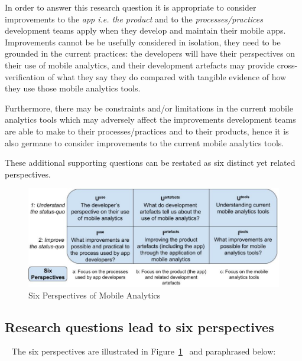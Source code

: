 In order to answer this research question it is appropriate to consider improvements to the \emph{app i.e. the product} and to the \emph{processes/practices} development teams apply when they develop and maintain their mobile apps. Improvements cannot be be usefully considered in isolation, they need to be grounded in the current practices: the developers will have their perspectives on their use of mobile analytics, and their development artefacts may provide cross-verification of what they say they do compared with tangible evidence of how they use those mobile analytics tools. 

Furthermore, there may be constraints and/or limitations in the current mobile analytics tools which may adversely affect the improvements development teams are able to make to their processes/practices and to their products, hence it is also germane to consider improvements to the current mobile analytics tools.

These additional supporting questions can be restated as six distinct yet related perspectives.

\begin{figure}
    \includegraphics[width=\linewidth]{images/my/six-perspectives-2x3-matrix-12-nov-2021.jpeg}
    \caption{Six Perspectives of Mobile Analytics}
    \label{fig:six-perspectives-in-the-research-questions-section}
\end{figure}

\subsection{Research questions lead to six perspectives}~\label{rq-leads-to-six-perspectives}
The six perspectives are illustrated in Figure~\ref{fig:six-perspectives-in-the-research-questions-section}~ and paraphrased below:


